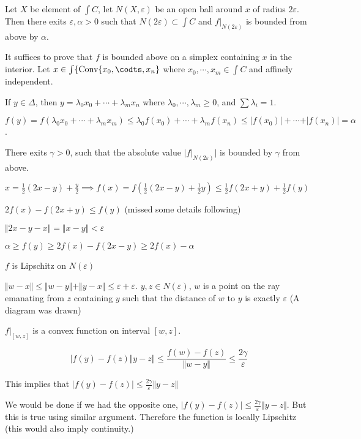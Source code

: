 \documentclass[11pt]{article}
\def\conv{\operatorname{Conv}}
\begin{document}
Let \(X\) be element of \(\int C\), let \(N(X, \varepsilon)\) be an open ball
around \(x\) of radius \(2\varepsilon\). Then there exits \(\varepsilon, \alpha >
    0\) such that \(N(2\varepsilon) \subset \int C\) and \(f\vert_{N(2\varepsilon)}\)
is bounded from above by \(\alpha\).

It suffices to prove that \(f\) is bounded above on a simplex containing \(x\)
in the interior. Let \(x \in \int\{\conv\{x_0, \codts, x_{n}\}\) where \(x_0,
    \cdots, x_m \in \int C\) and affinely independent.

If \(y \in \Delta\), then \(y = \lambda_0 x_0 + \cdots + \lambda_m x_n\) where
\(\lambda_0, \cdots, \lambda_m \ge 0\), and \(\sum \lambda_i = 1\).

\(f(y) = f(\lambda_0 x_0 + \cdots + \lambda_m x_m) \le \lambda_0 f(x_0) +
    \cdots + \lambda_m f(x_n) \le \vert f(x_0) \vert + \cdots + \vert f(x_n)
    \vert = \alpha\).

There exits \(\gamma > 0\), such that the absolute value \(\vert
    f\vert_{N(2\varepsilon)}\vert\) is bounded by \(\gamma\) from above.

\(x = \frac{1}{2}(2x-y) + \frac{y}{2} \implies f(x) = f(\frac{1}{2}(2x-y) +
    \frac{1}{2}y) \le \frac{1}{2} f(2x + y) + \frac{1}{2} f(y)\)

\(2f(x) - f(2x + y) \le f(y)\) (missed some details following)

\(\Vert 2x - y - x\Vert = \Vert x - y \Vert < \varepsilon\)

\(\alpha \ge f(y) \ge 2 f(x) - f(2x - y) \ge 2 f(x) - \alpha\)

\(f\) is Lipschitz on \(N(\varepsilon)\)

\(\Vert w - x \Vert \le \Vert w - y\Vert + \Vert y - x\Vert \le \varepsilon +
    \varepsilon\). \(y, z \in N(\varepsilon)\), \(w\) is a point on the ray emanating
from \(z\) containing \(y\) such that the distance of \(w\) to \(y\) is exactly
\(\varepsilon\) (A diagram was drawn)

\(f\vert_{[w, z]}\) is a convex function on interval \([w, z]\).

$$\vert{f(y) - f(z)}{\Vert y -z\Vert} \le \frac{f(w) - f(z)}{\Vert w - y
    \Vert} \le \frac{2\gamma}{\varepsilon}$$

This implies that \(\vert f(y) - f(z)\vert \le \frac{2\gamma}{\varepsilon}
    \Vert y - z\Vert\)

We would be done if we had the opposite one, \(\vert f(y) - f(z)\vert \le
    \frac{2\gamma}{\varepsilon} \Vert y - z\Vert\). But this is true using
similar argument. Therefore the function is locally Lipschitz (this would
also imply continuity.)    
\end{document}
